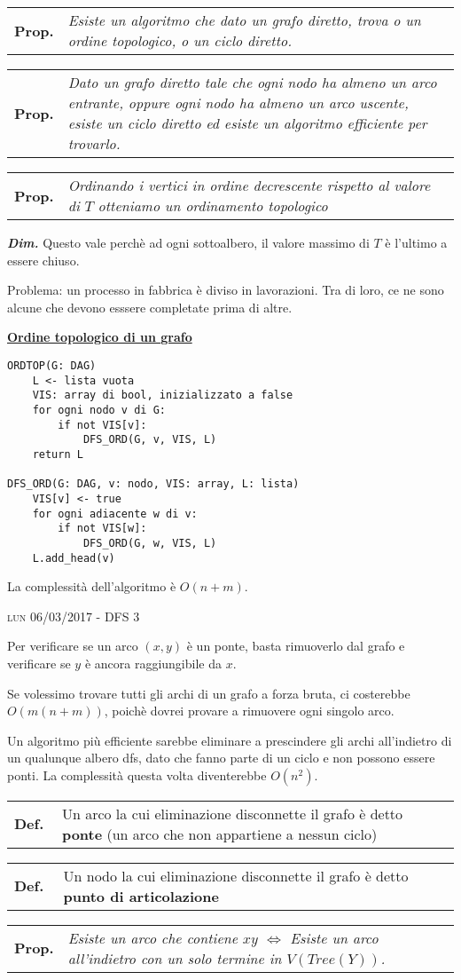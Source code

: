 \documentclass[a4paper,10pt]{article} %
\newcommand{\dimo}[1]{%
    \smallbreak \par \hfill\begin{minipage}{0.92\linewidth}{ \scriptsize {\textbf{\em{Dim.}}} {#1} }\end{minipage} \smallskip \par}
\newcommand{\malgorithm}[1]{%
    {\bigbreak \par \hspace*{4pt} \underline{\textbf {#1}}}}
\newcommand{\msection}[1]{%
    {\newpage\bigbreak \bigbreak \par \hfil \huge \textsc {#1}}\par}
\renewcommand{\b}[1]{%
    {\textbf{#1}}}
\newcommand{\mdef}[1]{%
    {\smallbreak\par\begin{tabular}{ll} \textbf{Def.$\;\;$} & \begin{minipage}[t]{0.80\columnwidth}\normalsize  {#1}\end{minipage}\tabularnewline \end{tabular}}\smallskip\par}
\newcommand{\mprop}[1]{%
    {\smallbreak\par\begin{tabular}{ll} \textbf{Prop.} & \begin{minipage}[t]{0.8\columnwidth}\emph  {#1}\end{minipage}\tabularnewline \end{tabular}}\smallskip\par}
\begin{document}
\mprop{Esiste un algoritmo che dato un grafo diretto, trova o un ordine topologico, o un ciclo diretto.}

\mprop{Dato un grafo diretto tale che ogni nodo ha almeno un arco entrante, oppure ogni nodo ha almeno un arco uscente, esiste un ciclo diretto ed esiste un algoritmo efficiente per trovarlo.}

\mprop{Ordinando i vertici in ordine decrescente rispetto al valore di $T$ otteniamo un ordinamento topologico}
\dimo{Questo vale perchè ad ogni sottoalbero, il valore massimo di $T$ è l'ultimo a essere chiuso.}

Problema: un processo in fabbrica è diviso in lavorazioni. Tra di loro, ce ne sono alcune che devono esssere completate prima di altre.

\malgorithm{Ordine topologico di un grafo}
\begin{lstlisting}
ORDTOP(G: DAG)
    L <- lista vuota
    VIS: array di bool, inizializzato a false
    for ogni nodo v di G:
        if not VIS[v]:
            DFS_ORD(G, v, VIS, L)
    return L

DFS_ORD(G: DAG, v: nodo, VIS: array, L: lista)
    VIS[v] <- true
    for ogni adiacente w di v:
        if not VIS[w]:
            DFS_ORD(G, w, VIS, L)
    L.add_head(v)
\end{lstlisting}
La complessità dell'algoritmo è $O(n + m)$.



\msection{lun 06/03/2017 - DFS 3}




Per verificare se un arco $(x,y)$ è un ponte, basta rimuoverlo dal grafo e verificare se $y$ è ancora raggiungibile da $x$.

Se volessimo trovare tutti gli archi di un grafo a forza bruta, ci costerebbe $O(m(n+m))$, poichè dovrei provare a rimuovere ogni singolo arco.

Un algoritmo più efficiente sarebbe eliminare a prescindere gli archi all'indietro di un qualunque albero dfs, dato che fanno parte di un ciclo e non possono essere ponti. La complessità questa volta diventerebbe $O(n^2)$.

\mdef{Un arco la cui eliminazione disconnette il grafo è detto \b{ponte} (un arco che non appartiene a nessun ciclo)}

\mdef{Un nodo la cui eliminazione disconnette il grafo è detto \b{punto di articolazione}}

\mprop{Esiste un arco che contiene $xy$ $\Leftrightarrow$ Esiste un arco all'indietro con un solo termine in $V(Tree(Y))$.}
\end{document}
